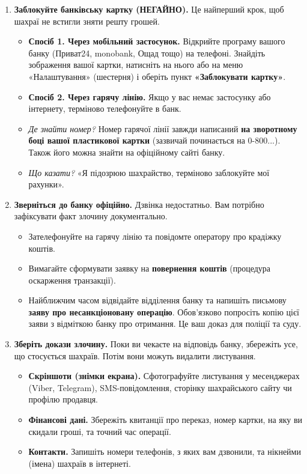\begin{enumerate}
    \item \textbf{Заблокуйте банківську картку (НЕГАЙНО).}
    Це найперший крок, щоб шахраї не встигли зняти решту грошей.
    \begin{itemize}
        \item \textbf{Спосіб 1. Через мобільний застосунок.} Відкрийте програму вашого банку (Приват24, monobank, Ощад тощо) на телефоні. Знайдіть зображення вашої картки, натисніть на нього або на меню «Налаштування» (шестерня) і оберіть пункт \textbf{«Заблокувати картку»}.
   \newpage
   
        \item \textbf{Спосіб 2. Через гарячу лінію.} Якщо у вас немає застосунку або інтернету, терміново телефонуйте в банк.
        \item \textit{Де знайти номер?} Номер гарячої лінії завжди написаний \textbf{на зворотному боці вашої пластикової картки} (зазвичай починається на 0-800...). Також його можна знайти на офіційному сайті банку.
        \item \textit{Що казати?} «Я підозрюю шахрайство, терміново заблокуйте мої рахунки».
    \end{itemize}

    \item \textbf{Зверніться до банку офіційно.}
    Дзвінка недостатньо. Вам потрібно зафіксувати факт злочину документально.
    \begin{itemize}
        \item Зателефонуйте на гарячу лінію та повідомте оператору про крадіжку коштів.
        \item Вимагайте сформувати заявку на \textbf{повернення коштів} (процедура оскарження транзакції).
        \item Найближчим часом відвідайте відділення банку та напишіть письмову \textbf{заяву про несанкціоновану операцію}. Обов'язково попросіть копію цієї заяви з відміткою банку про отримання. Це ваш доказ для поліції та суду.
    \end{itemize}

    \item \textbf{Зберіть докази злочину.}
    Поки ви чекаєте на відповідь банку, збережіть усе, що стосується шахраїв. Потім вони можуть видалити листування.
    \begin{itemize}
        \item \textbf{Скріншоти (знімки екрана).} Сфотографуйте листування у месенджерах (Viber, Telegram), SMS-повідомлення, сторінку шахрайського сайту чи профілю продавця.
        \item \textbf{Фінансові дані.} Збережіть квитанції про переказ, номер картки, на яку ви скидали гроші, та точний час операції.
        \item \textbf{Контакти.} Запишіть номери телефонів, з яких вам дзвонили, та нікнейми (імена) шахраїв в інтернеті.
    \end{itemize}


\end{enumerate}
